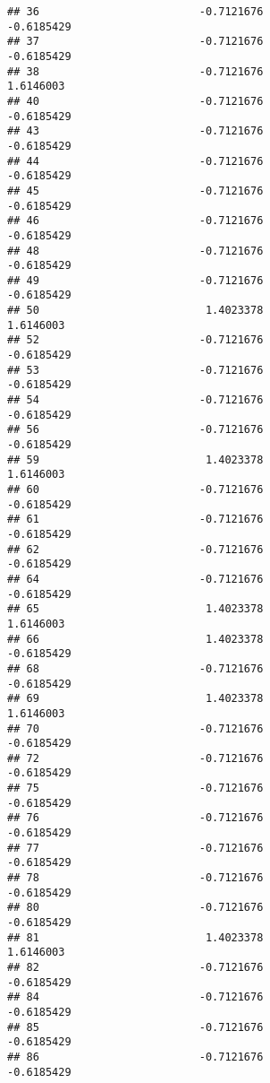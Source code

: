 \documentclass[
]{article}
\begin{document}
\begin{verbatim}
## 36                         -0.7121676                       -0.6185429
## 37                         -0.7121676                       -0.6185429
## 38                         -0.7121676                        1.6146003
## 40                         -0.7121676                       -0.6185429
## 43                         -0.7121676                       -0.6185429
## 44                         -0.7121676                       -0.6185429
## 45                         -0.7121676                       -0.6185429
## 46                         -0.7121676                       -0.6185429
## 48                         -0.7121676                       -0.6185429
## 49                         -0.7121676                       -0.6185429
## 50                          1.4023378                        1.6146003
## 52                         -0.7121676                       -0.6185429
## 53                         -0.7121676                       -0.6185429
## 54                         -0.7121676                       -0.6185429
## 56                         -0.7121676                       -0.6185429
## 59                          1.4023378                        1.6146003
## 60                         -0.7121676                       -0.6185429
## 61                         -0.7121676                       -0.6185429
## 62                         -0.7121676                       -0.6185429
## 64                         -0.7121676                       -0.6185429
## 65                          1.4023378                        1.6146003
## 66                          1.4023378                       -0.6185429
## 68                         -0.7121676                       -0.6185429
## 69                          1.4023378                        1.6146003
## 70                         -0.7121676                       -0.6185429
## 72                         -0.7121676                       -0.6185429
## 75                         -0.7121676                       -0.6185429
## 76                         -0.7121676                       -0.6185429
## 77                         -0.7121676                       -0.6185429
## 78                         -0.7121676                       -0.6185429
## 80                         -0.7121676                       -0.6185429
## 81                          1.4023378                        1.6146003
## 82                         -0.7121676                       -0.6185429
## 84                         -0.7121676                       -0.6185429
## 85                         -0.7121676                       -0.6185429
## 86                         -0.7121676                       -0.6185429

\end{verbatim}
\end{document}
